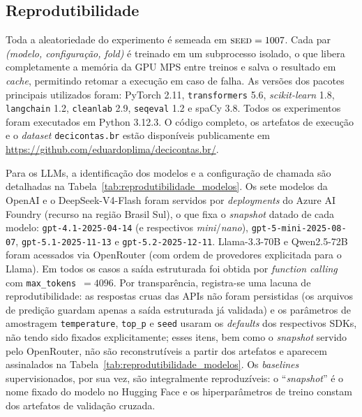 \subsection{Reprodutibilidade}
\label{sec:reprodutibilidade}

Toda a aleatoriedade do experimento é semeada em $\textsc{seed} = 1007$. Cada par \textit{(modelo, configuração, fold)} é treinado em um subprocesso isolado, o que libera completamente a memória da GPU MPS entre treinos e salva o resultado em \textit{cache}, permitindo retomar a execução em caso de falha. As versões dos pacotes principais utilizados foram: PyTorch 2.11, \texttt{transformers} 5.6, \textit{scikit-learn} 1.8, \texttt{langchain} 1.2, \texttt{cleanlab} 2.9, \texttt{seqeval} 1.2 e spaCy 3.8. Todos os experimentos foram executados em Python 3.12.3. O código completo, os artefatos de execução e o \textit{dataset} \texttt{decicontas.br} estão disponíveis publicamente em \url{https://github.com/eduardoplima/decicontas.br/}.

Para os LLMs, a identificação dos modelos e a configuração de chamada são detalhadas na Tabela~\ref{tab:reprodutibilidade_modelos}. Os sete modelos da OpenAI e o DeepSeek-V4-Flash foram servidos por \textit{deployments} do Azure AI Foundry (recurso na região Brasil Sul), o que fixa o \textit{snapshot} datado de cada modelo: \texttt{gpt-4.1-2025-04-14} (e respectivos \textit{mini}/\textit{nano}), \texttt{gpt-5-mini-2025-08-07}, \texttt{gpt-5.1-2025-11-13} e \texttt{gpt-5.2-2025-12-11}. Llama-3.3-70B e Qwen2.5-72B foram acessados via OpenRouter (com ordem de provedores explicitada para o Llama). Em todos os casos a saída estruturada foi obtida por \textit{function calling} com \texttt{max\_tokens}~$=4096$. Por transparência, registra-se uma lacuna de reprodutibilidade: as respostas cruas das APIs não foram persistidas (os arquivos de predição guardam apenas a saída estruturada já validada) e os parâmetros de amostragem \texttt{temperature}, \texttt{top\_p} e \texttt{seed} usaram os \textit{defaults} dos respectivos SDKs, não tendo sido fixados explicitamente; esses itens, bem como o \textit{snapshot} servido pelo OpenRouter, não são reconstrutíveis a partir dos artefatos e aparecem assinalados na Tabela~\ref{tab:reprodutibilidade_modelos}. Os \textit{baselines} supervisionados, por sua vez, são integralmente reproduzíveis: o ``\textit{snapshot}'' é o nome fixado do modelo no Hugging Face e os hiperparâmetros de treino constam dos artefatos de validação cruzada.

